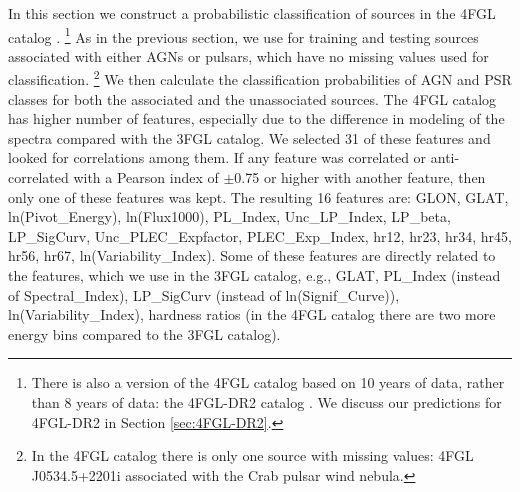 In this section we construct a probabilistic classification of sources in the 4FGL catalog \citep{2020ApJS..247...33A}.%
\footnote{There is also a version of the 4FGL catalog based on 10 years of data, rather than 8 years of data: the 4FGL-DR2 catalog
\citep{2020arXiv200511208B}. We discuss our predictions for 4FGL-DR2 in Section \ref{sec:4FGL-DR2}.}
As in the previous section, we use for training and testing sources associated with either AGNs or pulsars,
which have no missing values used for classification.%
\footnote{In the 4FGL catalog there is only one source with missing values: 4FGL J0534.5+2201i associated with the Crab pulsar wind nebula.}
We then calculate the classification probabilities of AGN and PSR classes for both the associated and the unassociated sources.
The 4FGL catalog has higher number of features, especially due to the difference in modeling of the spectra compared with the 3FGL catalog. 
We selected 31 of these features and looked for correlations among them. If any feature was correlated or anti-correlated with a Pearson index of $\pm$0.75 or higher with another feature, then only one of these features was kept. 
The resulting 16 features are:
GLON, GLAT, ln(Pivot\_Energy), ln(Flux1000), PL\_Index, Unc\_LP\_Index, LP\_beta, LP\_SigCurv, Unc\_PLEC\_Expfactor, PLEC\_Exp\_Index, hr12, hr23, hr34, hr45, hr56, hr67, ln(Variability\_Index).
Some of these features are directly related to the features, which we use in the 3FGL catalog,
e.g., GLAT, PL\_Index (instead of Spectral\_Index), LP\_SigCurv (instead of ln(Signif\_Curve)), 
ln(Variability\_Index), hardness ratios (in the 4FGL catalog there are two more energy bins compared to the 3FGL catalog).

